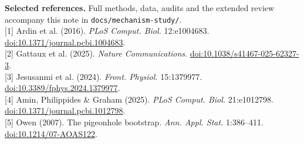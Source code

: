 \documentclass[10pt,a4paper]{article}
\begin{document}
\vspace{3pt}
{\footnotesize
\textbf{Selected references.} Full methods, data, audits and the extended review
accompany this note in \texttt{docs/mechanism-study/}.\\
{}[1] Ardin et al. (2016). \emph{PLoS Comput. Biol.} 12:e1004683.
\href{https://doi.org/10.1371/journal.pcbi.1004683}{doi:10.1371/journal.pcbi.1004683}.\\
{}[2] Gattaux et al. (2025). \emph{Nature Communications}.
\href{https://doi.org/10.1038/s41467-025-62327-3}{doi:10.1038/s41467-025-62327-3}.\\
{}[3] Jesusanmi et al. (2024). \emph{Front. Physiol.} 15:1379977.
\href{https://doi.org/10.3389/fphys.2024.1379977}{doi:10.3389/fphys.2024.1379977}.\\
{}[4] Amin, Philippides \& Graham (2025). \emph{PLoS Comput. Biol.} 21:e1012798.
\href{https://doi.org/10.1371/journal.pcbi.1012798}{doi:10.1371/journal.pcbi.1012798}.\\
{}[5] Owen (2007). The pigeonhole bootstrap. \emph{Ann. Appl. Stat.} 1:386--411.
\href{https://doi.org/10.1214/07-AOAS122}{doi:10.1214/07-AOAS122}.
\par}
\end{document}
